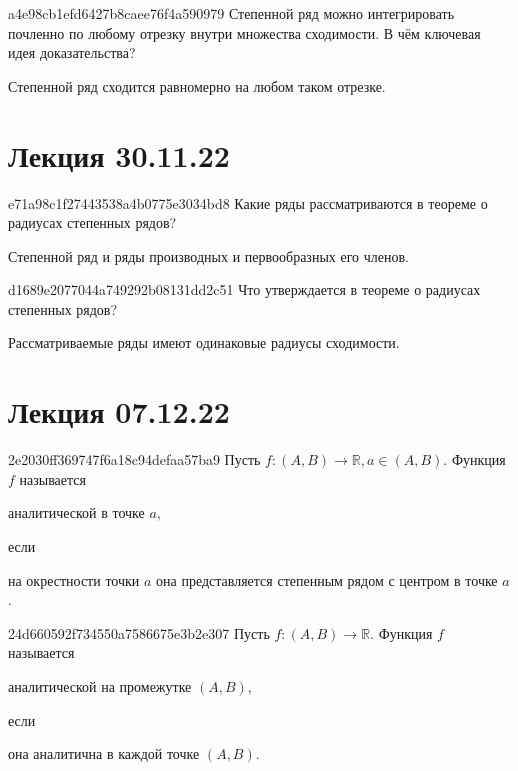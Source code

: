\begin{note}{a4e98cb1efd6427b8caee76f4a590979}
    Степенной ряд можно интегрировать почленно по любому отрезку внутри множества сходимости.
    В чём ключевая идея доказательства?

    \begin{cloze}{1}
        Степенной ряд сходится равномерно на любом таком отрезке.
    \end{cloze}
\end{note}

\section{Лекция 30.11.22}
\begin{note}{e71a98c1f27443538a4b0775e3034bd8}
    Какие ряды рассматриваются в теореме о радиусах степенных рядов?

    \begin{cloze}{1}
        Степенной ряд и ряды производных и первообразных его членов.
    \end{cloze}
\end{note}

\begin{note}{d1689e2077044a749292b08131dd2c51}
    Что утверждается в теореме о радиусах степенных рядов?

    \begin{cloze}{1}
        Рассматриваемые ряды имеют одинаковые радиусы сходимости.
    \end{cloze}
\end{note}

\section{Лекция 07.12.22}
\begin{note}{2e2030ff369747f6a18c94defaa57ba9}
    Пусть \({ f : (A, B) \to \mathbb R, a \in (A, B) }\).
    Функция \({ f }\) называется \begin{icloze}{2}аналитической в точке \({ a }\),\end{icloze} если \begin{icloze}{1}на окрестности точки \({ a }\) она представляется степенным рядом с центром в точке \({ a }\).\end{icloze}
\end{note}

\begin{note}{24d660592f734550a7586675e3b2e307}
    Пусть \({ f : (A, B) \to \mathbb R }\).
    Функция \({ f }\) называется \begin{icloze}{2}аналитической на промежутке \({ (A, B) }\),\end{icloze} если \begin{icloze}{1}она аналитична в каждой точке \({ (A, B) }\).\end{icloze}
\end{note}

